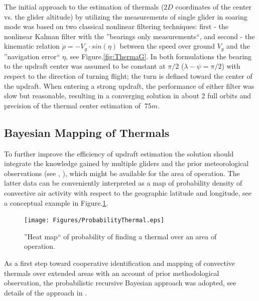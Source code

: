\documentclass{ifacconf}
\newcommand{\squeezeup}{\vspace{-2.0mm}}
\begin{document}
The initial approach to the estimation of thermals ($2D$ coordinates of the
center vs. the glider altitude) by utilizing the measurements of single
glider in soaring mode was based on two classical nonlinear filtering
techniques: first - the nonlinear Kalman filter with the ''bearings only
measurements``, and second - the kinematic relation $\dot{\rho}=-V_g\cdot
sin(\eta)$ between the speed over ground $V_g$ and the ''navigation error``
$\eta$, see Figure.\ref{fig:ThermaG}. In both formulations the bearing to the
updraft center was assumed to be constant at $\pi/2$ ($\lambda-\psi=\pi/2$)
with respect to the direction of turning flight; the turn is defined toward
the center of the updraft. When entering a strong updraft, the performance of
either filter was slow but reasonable, resulting in a converging solution in
about 2 full orbits and precision of the thermal center estimation of $~75m$.
%

\subsection{Bayesian Mapping of Thermals}
\label{subsec:BayesianMapping}
\squeezeup

To further improve the efficiency of updraft estimation the solution should
integrate the knowledge gained by multiple gliders and the prior
meteorological observations (see \cite{Pennycuick:1998},
\cite{Hindman:2007}), which might be available for the area of operation. The
latter data can be conveniently interpreted as a map of probability density
of convective air activity with respect to the geographic latitude and
longitude, see a conceptual example in Figure.\ref{fig:HeatMap}.
\begin{figure}[thpb]
  \centering
  \texttt{[image: Figures/ProbabilityThermal.eps]}
  \caption{''Heat map`` of probability of finding a thermal over an area of operation.}
  \label{fig:HeatMap}
\end{figure}
As a first step toward cooperative identification and mapping of convective thermals over
extended areas with an account of prior methodological observation, the probabilistic
recursive Bayesian approach was adopted, see details of the approach in
\cite{Bergman:1999}.
\end{document}
